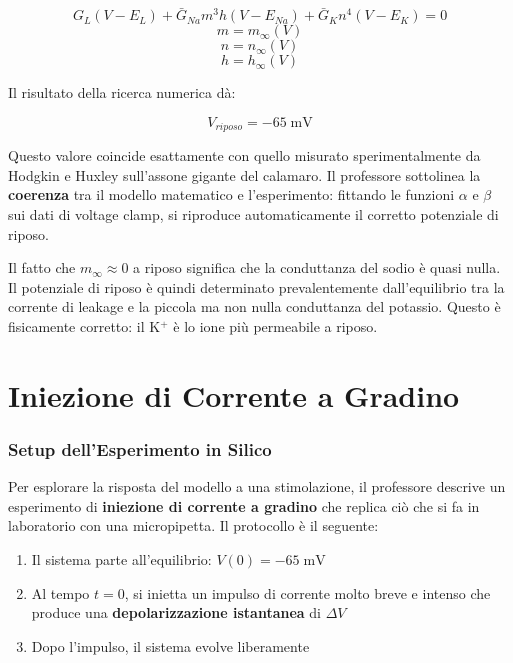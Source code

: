 \begin{equation}
G_L(V - E_L) + \bar{G}_{Na} m^3 h (V - E_{Na}) + \bar{G}_K n^4 (V - E_K) = 0
\end{equation}
\begin{equation}
m = m_\infty(V)
\end{equation}
\begin{equation}
n = n_\infty(V)
\end{equation}
\begin{equation}
h = h_\infty(V)
\end{equation}


Il risultato della ricerca numerica dà:

\begin{equation}
V_{riposo} = -65 \; \text{mV}
\end{equation}

Questo valore coincide esattamente con quello misurato sperimentalmente da Hodgkin e Huxley sull'assone gigante del calamaro. Il professore sottolinea la \textbf{coerenza} tra il modello matematico e l'esperimento: fittando le funzioni $\alpha$ e $\beta$ sui dati di voltage clamp, si riproduce automaticamente il corretto potenziale di riposo.

\begin{tcolorbox}[colback=gray!5, colframe=gray!40, arc=2mm, boxrule=0.5pt]
Il fatto che $m_\infty \approx 0$ a riposo significa che la conduttanza del sodio è quasi nulla. Il potenziale di riposo è quindi determinato prevalentemente dall'equilibrio tra la corrente di leakage e la piccola ma non nulla conduttanza del potassio. Questo è fisicamente corretto: il K$^+$ è lo ione più permeabile a riposo.
\end{tcolorbox}


\section{Iniezione di Corrente a Gradino}

\subsubsection{Setup dell'Esperimento in Silico}

Per esplorare la risposta del modello a una stimolazione, il professore descrive un esperimento di \textbf{iniezione di corrente a gradino} che replica ciò che si fa in laboratorio con una micropipetta. Il protocollo è il seguente:

\begin{enumerate}
    \item Il sistema parte all'equilibrio: $V(0) = -65 \; \text{mV}$
    \item Al tempo $t = 0$, si inietta un impulso di corrente molto breve e intenso che produce una \textbf{depolarizzazione istantanea} di $\Delta V$
    \item Dopo l'impulso, il sistema evolve liberamente 
\end{enumerate}

